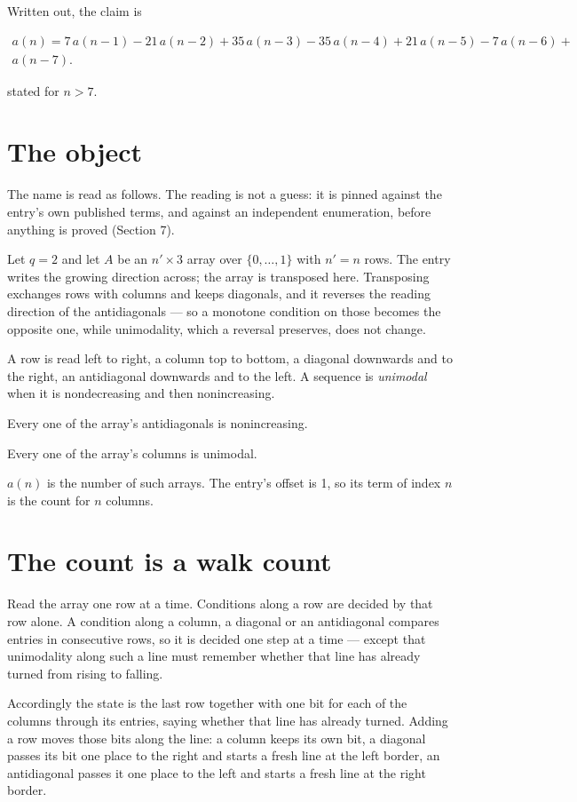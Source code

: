 \documentclass[11pt]{article}
\theoremstyle{definition}
\begin{document}
Written out, the claim is

\begin{multline*} a(n) = 7\,a(n-1) - 21\,a(n-2) + 35\,a(n-3) - 35\,a(n-4) + 21\,a(n-5) - 7\,a(n-6) + \\ a(n-7). \end{multline*}

stated for $n > 7$.

\section{The object}

The name is read as follows. The reading is not a guess: it is pinned against the entry's own published terms, and against an independent enumeration, before anything is proved (Section 7).

Let $q = 2$ and let $A$ be an $n' \times 3$ array over $\{0,\dots,1\}$ with $n' = n$ rows. The entry writes the growing direction across; the array is transposed here. Transposing exchanges rows with columns and keeps diagonals, and it reverses the reading direction of the antidiagonals --- so a monotone condition on those becomes the opposite one, while unimodality, which a reversal preserves, does not change.

A row is read left to right, a column top to bottom, a diagonal downwards and to the right, an antidiagonal downwards and to the left. A sequence is {\itshape unimodal} when it is nondecreasing and then nonincreasing.

Every one of the array's antidiagonals is nonincreasing.

Every one of the array's columns is unimodal.

$a(n)$ is the number of such arrays. The entry's offset is 1, so its term of index $n$ is the count for $n$ columns.

\section{The count is a walk count}

Read the array one row at a time. Conditions along a row are decided by that row alone. A condition along a column, a diagonal or an antidiagonal compares entries in consecutive rows, so it is decided one step at a time --- except that unimodality along such a line must remember whether that line has already turned from rising to falling.

Accordingly the state is the last row together with one bit for each of the columns through its entries, saying whether that line has already turned. Adding a row moves those bits along the line: a column keeps its own bit, a diagonal passes its bit one place to the right and starts a fresh line at the left border, an antidiagonal passes it one place to the left and starts a fresh line at the right border.
\end{document}
